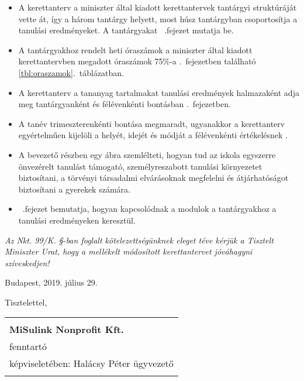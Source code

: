\begin{itemize}
      \item A kerettanterv a miniszter által kiadott kerettantervek tantárgyi struktúráját vette át, így a három tantárgy helyett, most húsz tantárgyban csoportosítja a tanulási eredményeket. A tantárgyakat ~.fejezet mutatja be.
      \item A tantárgyakhoz rendelt heti óraszámok a miniszter által kiadott kerettantervben megadott óraszámok 75\%-a .~fejezetben található \ref{tbl:oraszamok}.~táblázatban.
      \item A kerettanterv a tananyag tartalmakat tanulási eredmények halmazaként adja meg tantárgyanként és félévenkénti bontásban .~fejezetben.
      \item A tanév trimeszterenkénti bontása megmaradt, ugyanakkor a kerettanterv egyértelműen kijelöli a helyét, idejét és módját a félévenkénti értékelésnek .
      \item A bevezető részben egy ábra szemlélteti, hogyan tud az iskola egyszerre önvezérelt tanulást támogató, személyreszabott tanulási környezetet biztosítani, a törvényi társadalmi elvárásoknak megfelelni és átjárhatóságot biztosítani a gyerekek számára.
      \item {}~.fejezet bemutatja, hogyan kapcsolódnak a modulok a tantárgyakhoz a tanulási eredményeken keresztül.
\end{itemize}


\noindent
\emph{Az Nkt. 99/K. §-ban foglalt kötelezettségünknek eleget téve kérjük a Tisztelt Miniszter Urat, hogy a mellékelt módosított kerettantervet jóváhagyni szíveskedjen!}

\vspace{0.75cm}

\noindent
Budapest, 2019. július 29.

\vspace{0.75cm}
\noindent
Tisztelettel,

\vspace{0.75cm}
\noindent
\begin{center}
      \begin{tabular}{p{8cm}}
            \begin{center}
                  \hrulefill \\
                  \textbf{MiSulink Nonprofit Kft.} \\
                  fenntartó\\
                  képviseletében: Halácsy Péter ügyvezető \\
            \end{center}
      \end{tabular}
\end{center}
\newpage